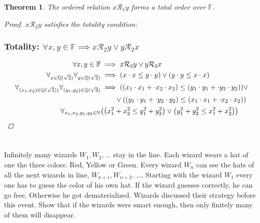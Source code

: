 \documentclass[]{article}
\newcommand{\Rel}{\mathcal{R}}
\newcommand{\N}{\mathbb{N}}
\newcommand{\Q}{\mathbb{Q}}
\newtheorem{theorem}{Theorem}
\begin{document}
\begin{theorem}
    The ordered relation $x \Rel_1 y$ forms a total order over $\mathbb{F}$.
    \begin{proof}
        $x \Rel_2 y$ satisfies the totality condition:
        \subsubsection{Totality: 
        $\forall x,y \in \mathbb{F} \implies x \Rel_2 y \lor y \Rel_2 x$}
        \begin{align*}
            \forall x,y \in \mathbb{F} &\implies x \Rel_2 y \lor y \Rel_2 x\\
            \forall_{x \in \Q(\sqrt{2})}
                    \forall_{y \in \Q(\sqrt{2})}
                &\implies \qty(x \cdot x \leq y \cdot y)
                    \lor \qty(y \cdot y \leq x \cdot x)\\
            \forall_{(x_1,x_2) \in \Q(\sqrt{2}))}
                    \forall_{(y_1,y_2) \in \Q(\sqrt{2})}
                &\implies \qty((x_1 \cdot x_1 + \cdot x_2 \cdot x_2)
                    \leq (y_1 \cdot y_1 + \cdot y_2 \cdot y_2)) \lor\\
                &\qquad \lor \qty((y_1 \cdot y_1 + \cdot y_2 \cdot y_2)
                    \leq (x_1 \cdot x_1 + \cdot x_2 \cdot x_2))\\
            \forall_{x_1, x_2, y_1, y_2 \in \N}
                &\qty(\qty(x_1^2 + x_2^2 \leq y_1^2 + y_2^2)
                    \lor \qty(y_1^2 + y_2^2 \leq x_1^2 + x_2^2))\\
        \end{align*}
    \end{proof}
\end{theorem}

\newpage
\section{}
Infinitely many wizards $W_1, W_2,\dots$ stay in the line.
Each wizard wears a hat of one the three colors: Red, Yellow or Green. 
Every wizard $W_n$ can see the hats of all the next wizards in line, $W_{n+1}, W_{n+2}, \dots$,
Starting  with  the  wizard $W_1$ every one has to guess the color of his own hat. 
If the wizard guesses correctly, he can go free. Otherwise he got dematerialized. 
Wizards  discussed  their  strategy  before  this  event. 
Show that if the wizards were smart enough, then only finitely many of them will disappear.
\end{document}
